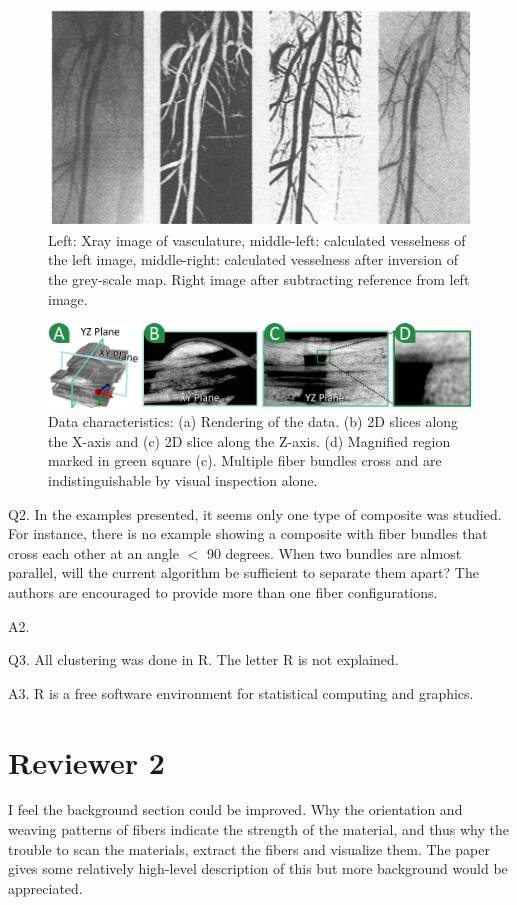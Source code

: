\documentclass[]{article}
\begin{document}
\begin{figure}
\centering
\includegraphics[width=0.7\linewidth]{images_pvis/Vesselness}
\caption{Left: Xray image of vasculature, middle-left: calculated vesselness of the left image, middle-right: calculated vesselness after inversion of the grey-scale map. Right image after subtracting reference from left image.}
\label{fig:Vesselness}
\end{figure}

\begin{figure}[tb]
	\centering
	\includegraphics[width=\linewidth]{images_pvis/data-char.pdf}
	\caption{Data characteristics: (a) Rendering of the data. (b) 2D slices along the X-axis and (c) 2D slice along the Z-axis. (d) Magnified region marked in green square (c). Multiple fiber bundles cross and are indistinguishable by visual inspection alone. }
	\label{fig:data-char-rebuttal}
\end{figure}

\color{red}
Q2. In the examples presented, it seems only one type of composite was studied. For instance, there is no example showing a composite with fiber bundles that cross each other at an angle $<$ 90 degrees. When two bundles are almost parallel, will the current algorithm be sufficient to separate them apart? The authors are encouraged to provide more than one fiber configurations.
\color{black}

A2.

\color{red}
Q3. All clustering was done in R. The letter R is not explained.
\color{black}

A3. R is a free software environment for statistical computing and graphics.

\section{Reviewer 2}
\color{red}
I feel the background section could be improved. Why the orientation and weaving patterns of fibers indicate the strength of the material, and thus why the trouble to scan the materials, extract the fibers and visualize them. The paper gives some relatively high-level description of this but more background would be appreciated.
\end{document}
